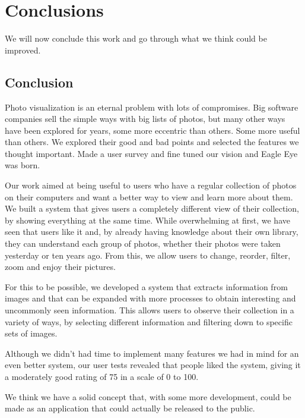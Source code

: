 \chapter{Conclusions}
\label{chapter:conclusions}

We will now conclude this work and go through what we think could be improved.



\section{Conclusion} %
\label{sec:conclusion}

Photo visualization is an eternal problem with lots of compromises. Big software companies sell the simple ways with big lists of photos, but many other ways have been explored for years, some more eccentric than others. Some more useful than others. We explored their good and bad points and selected the features we thought important. Made a user survey and fine tuned our vision and Eagle Eye was born.

Our work aimed at being useful to users who have a regular collection of photos on their computers and want a better way to view and learn more about them. We built a system that gives users a completely different view of their collection, by showing everything at the same time. While overwhelming at first, we have seen that users like it and, by already having knowledge about their own library, they can understand each group of photos, whether their photos were taken yesterday or ten years ago. From this, we allow users to change, reorder, filter, zoom and enjoy their pictures.

For this to be possible, we developed a system that extracts information from images and that can be expanded with more processes to obtain interesting and uncommonly seen information. This allows  users to observe their collection in a variety of ways, by selecting different information and filtering down to specific sets of images.


Although we didn't had time to implement many features we had in mind for an even better system, our user tests revealed that people liked the system, giving it a moderately good rating of 75 in a scale of 0 to 100. 

We think we have a solid concept that, with some more development, could be made as an application that could actually be released to the public.







